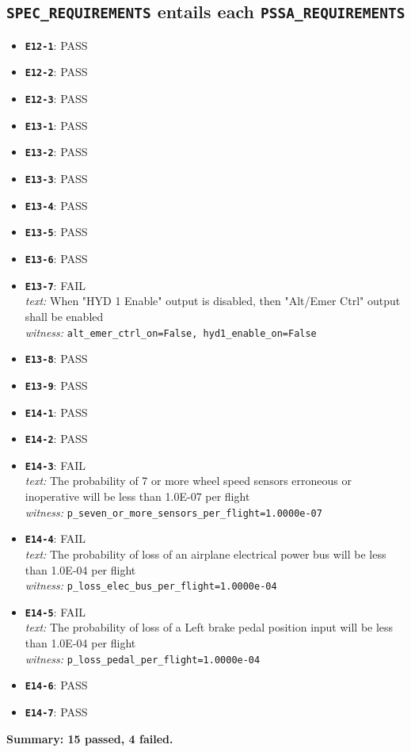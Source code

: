 \documentclass[11pt,a4paper]{article}
\begin{document}
\subsection*{\texttt{SPEC\_REQUIREMENTS} entails each \texttt{PSSA\_REQUIREMENTS}}
\begin{itemize}
\item \textbf{\texttt{E12-1}}: PASS
\item \textbf{\texttt{E12-2}}: PASS
\item \textbf{\texttt{E12-3}}: PASS
\item \textbf{\texttt{E13-1}}: PASS
\item \textbf{\texttt{E13-2}}: PASS
\item \textbf{\texttt{E13-3}}: PASS
\item \textbf{\texttt{E13-4}}: PASS
\item \textbf{\texttt{E13-5}}: PASS
\item \textbf{\texttt{E13-6}}: PASS
\item \textbf{\texttt{E13-7}}: FAIL \\
\textit{text:} When "HYD 1 Enable" output is disabled, then "Alt/Emer Ctrl" output shall be enabled \\
\textit{witness:} \texttt{alt\_emer\_ctrl\_on=False, hyd1\_enable\_on=False}
\item \textbf{\texttt{E13-8}}: PASS
\item \textbf{\texttt{E13-9}}: PASS
\item \textbf{\texttt{E14-1}}: PASS
\item \textbf{\texttt{E14-2}}: PASS
\item \textbf{\texttt{E14-3}}: FAIL \\
\textit{text:} The probability of 7 or more wheel speed sensors erroneous or inoperative will be less than 1.0E-07 per flight \\
\textit{witness:} \texttt{p\_seven\_or\_more\_sensors\_per\_flight=1.0000e-07}
\item \textbf{\texttt{E14-4}}: FAIL \\
\textit{text:} The probability of loss of an airplane electrical power bus will be less than 1.0E-04 per flight \\
\textit{witness:} \texttt{p\_loss\_elec\_bus\_per\_flight=1.0000e-04}
\item \textbf{\texttt{E14-5}}: FAIL \\
\textit{text:} The probability of loss of a Left brake pedal position input will be less than 1.0E-04 per flight \\
\textit{witness:} \texttt{p\_loss\_pedal\_per\_flight=1.0000e-04}
\item \textbf{\texttt{E14-6}}: PASS
\item \textbf{\texttt{E14-7}}: PASS
\end{itemize}
\textbf{Summary: 15 passed, 4 failed.}
\end{document}
